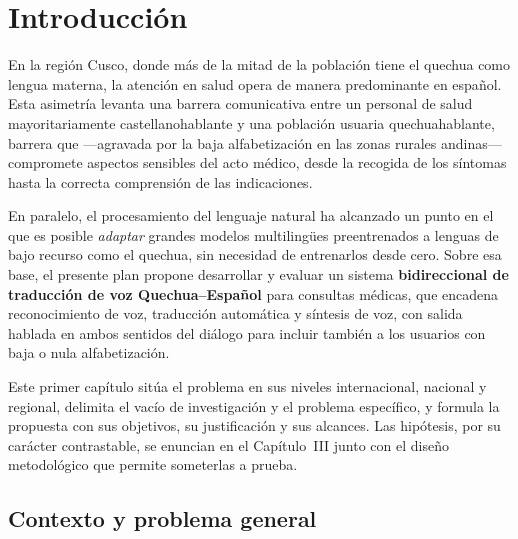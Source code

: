 \section{Introducci{\'o}n}
En la regi{\'o}n Cusco, donde m{\'a}s de la mitad de la poblaci{\'o}n tiene el quechua como lengua
materna, la atenci{\'o}n en salud opera de manera predominante en espa{\~n}ol. Esta asimetr{\'i}a
levanta una barrera comunicativa entre un personal de salud mayoritariamente castellanohablante y una
poblaci{\'o}n usuaria quechuahablante, barrera que ---agravada por la baja alfabetizaci{\'o}n en las
zonas rurales andinas--- compromete aspectos sensibles del acto m{\'e}dico, desde la recogida de los
s{\'i}ntomas hasta la correcta comprensi{\'o}n de las indicaciones.

En paralelo, el procesamiento del lenguaje natural ha alcanzado un punto en el que es posible
\emph{adaptar} grandes modelos multiling{\"u}es preentrenados a lenguas de bajo recurso como el
quechua, sin necesidad de entrenarlos desde cero. Sobre esa base, el presente plan propone desarrollar
y evaluar un sistema \textbf{bidireccional de traducci{\'o}n de voz Quechua--Espa{\~n}ol} para
consultas m{\'e}dicas, que encadena reconocimiento de voz, traducci{\'o}n autom{\'a}tica y s{\'i}ntesis
de voz, con salida hablada en ambos sentidos del di{\'a}logo para incluir tambi{\'e}n a los usuarios
con baja o nula alfabetizaci{\'o}n.

Este primer cap{\'i}tulo sit{\'u}a el problema en sus niveles internacional, nacional y regional,
delimita el vac{\'i}o de investigaci{\'o}n y el problema espec{\'i}fico, y formula la propuesta con sus
objetivos, su justificaci{\'o}n y sus alcances. Las hip{\'o}tesis, por su car{\'a}cter contrastable, se
enuncian en el Cap{\'i}tulo~III junto con el dise{\~n}o metodol{\'o}gico que permite someterlas a
prueba.

\subsection{Contexto y problema general}

